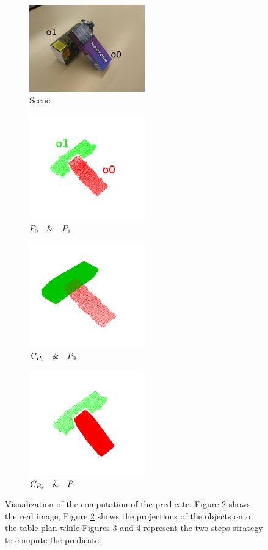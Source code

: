 \begin{figure}[tb]
\centering
\begin{subfigure}[t]{0.45\textwidth}
\centering
\includegraphics[width=5cm]{Img/on/on1.jpg}
\caption{Scene}\label{fig:on_predicate_original}
\end{subfigure}
\begin{subfigure}[t]{0.45\textwidth}
\centering
\includegraphics[width=5cm]{Img/on/on2.png}
\caption{$P_0 \quad \& \quad P_1$}\label{fig:on_1}
\end{subfigure}
\begin{subfigure}[t]{0.45\textwidth}
\centering
\includegraphics[width=5cm]{Img/on/on4.png}
\caption{${\sc C_{P_{1}}} \quad \& \quad {\sc P_{0}}$}\label{fig:on_2}
\end{subfigure}
\begin{subfigure}[t]{0.45\textwidth}
\centering
\includegraphics[width=5cm]{Img/on/on3.png}
\caption{${\sc C_{P_{0}}} \quad \& \quad {\sc P_{1}}$}\label{fig:on_3}
\end{subfigure}
\caption{Visualization of the computation of the  predicate. Figure \ref{fig:on_1} shows the real image, Figure \ref{fig:on_1} shows the projections of the objects onto the table plan while Figures \ref{fig:on_2} and \ref{fig:on_3} represent the two steps strategy to compute the  predicate.}\label{fig:on_predicate}
\end{figure}

